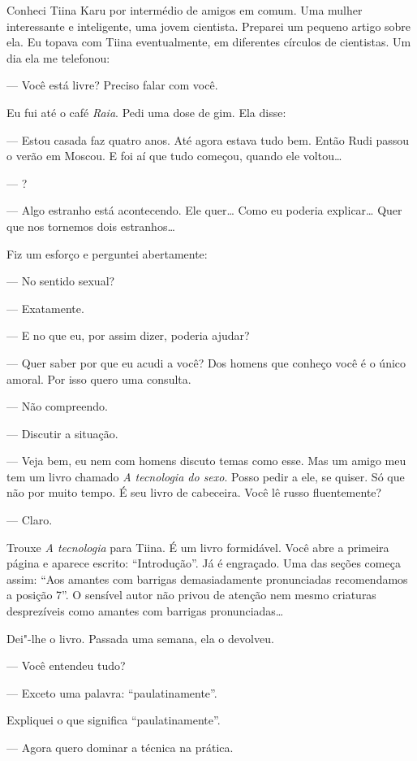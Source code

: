Conheci Tiina Karu por intermédio de amigos em comum. Uma mulher
interessante e inteligente, uma jovem cientista. Preparei um pequeno
artigo sobre ela. Eu topava com Tiina eventualmente, em diferentes
círculos de cientistas. Um dia ela me telefonou:

--- Você está livre? Preciso falar com você.

Eu fui até o café \emph{Raia}. Pedi uma dose de gim. Ela disse:

--- Estou casada faz quatro anos. Até agora estava tudo bem. Então Rudi
passou o verão em Moscou. E foi aí que tudo começou, quando ele
voltou\ldots{}

--- ?

--- Algo estranho está acontecendo. Ele quer\ldots{} Como eu poderia
explicar\ldots{} Quer que nos tornemos dois estranhos\ldots{}

Fiz um esforço e perguntei abertamente:

--- No sentido sexual?

--- Exatamente.

--- E no que eu, por assim dizer, poderia ajudar?

--- Quer saber por que eu acudi a você? Dos homens que conheço você é o
único amoral. Por isso quero uma consulta.

--- Não compreendo.

--- Discutir a situação.

--- Veja bem, eu nem com homens discuto temas como esse. Mas um amigo
meu tem um livro chamado \emph{A tecnologia do sexo}. Posso pedir a ele,
se quiser. Só que não por muito tempo. É seu livro de cabeceira. Você lê
russo fluentemente?

--- Claro.

Trouxe \emph{A tecnologia} para Tiina. É um livro formidável. Você abre
a primeira página e aparece escrito: ``Introdução''. Já é engraçado. Uma
das seções começa assim: ``Aos amantes com barrigas demasiadamente
pronunciadas recomendamos a posição 7''. O sensível autor não privou de
atenção nem mesmo criaturas desprezíveis como amantes com barrigas
pronunciadas\ldots{}

Dei"-lhe o livro. Passada uma semana, ela o devolveu.

--- Você entendeu tudo?

--- Exceto uma palavra: ``paulatinamente''.

Expliquei o que significa ``paulatinamente''.

--- Agora quero dominar a técnica na prática.

